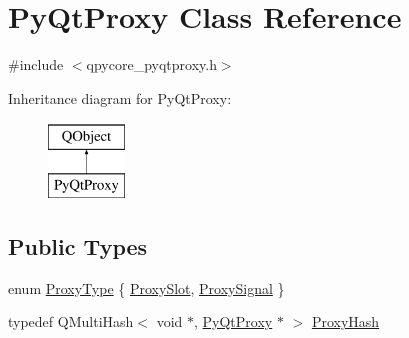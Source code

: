 \hypertarget{classPyQtProxy}{}\section{Py\+Qt\+Proxy Class Reference}
\label{classPyQtProxy}


{\ttfamily \#include $<$qpycore\+\_\+pyqtproxy.\+h$>$}

Inheritance diagram for Py\+Qt\+Proxy\+:\begin{figure}[H]
\begin{center}
\leavevmode
\includegraphics[height=2.000000cm]{classPyQtProxy}
\end{center}
\end{figure}
\subsection*{Public Types}
\begin{DoxyCompactItemize}
\item 
enum \hyperlink{classPyQtProxy_a785c9cec24cf6c5066d38606aec42d19}{Proxy\+Type} \{ \hyperlink{classPyQtProxy_a785c9cec24cf6c5066d38606aec42d19a832638d3c94b219f19b55d55f1aea78f}{Proxy\+Slot}, 
\hyperlink{classPyQtProxy_a785c9cec24cf6c5066d38606aec42d19a00a4eecf6fbb51cefe515aa35842dc92}{Proxy\+Signal}
 \}
\item 
typedef Q\+Multi\+Hash$<$ void $\ast$, \hyperlink{classPyQtProxy}{Py\+Qt\+Proxy} $\ast$ $>$ \hyperlink{classPyQtProxy_a85a17352880746150574caab4dafdeb4}{Proxy\+Hash}
\end{DoxyCompactItemize}
